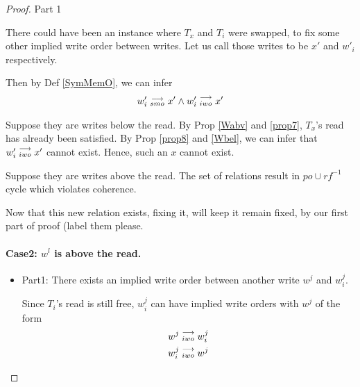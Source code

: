 \begin{proof}{Part 1}
\begin{itemize}
                        There could have been an instance where $T_x$ and $T_i$ were swapped, to fix some other implied write order between writes. 
                        Let us call those writes to be $x'$ and $w'_i$ respectively.
                        
                        Then by Def \ref{SymMemO}, we can infer 
                        \begin{align*}
                            w'_i\stackrel{\longrightarrow}{_{smo}}x' \wedge w'_i\stackrel{\longrightarrow}{_{iwo}}x'
                        \end{align*}

                        Suppose they are writes below the read. 
                        By Prop \ref{Wabv} and \ref{prop7}, $T_x$'s read has already been satisfied. By Prop \ref{prop8} and \ref{Wbel}, we can infer that $w'_i\stackrel{\longrightarrow}{_{iwo}}x'$ cannot exist. Hence, such an $x$ cannot exist.
                        
                        Suppose they are writes above the read.
                        The set of relations result in $po \cup rf^{-1}$ cycle which violates coherence.  


                \end{itemize}
                    Now that this new relation exists, fixing it, will keep it remain fixed, by our first part of proof (label them please. 
                    
            
            \paragraph{Case2: $w^l$ is above the read.}
                
                \begin{itemize}
                    \item Part1: There exists an implied write order between another write $w^j$ and $w_i^j$.

                        Since $T_i$'s read is still free, $w_i^j$ can have implied write orders with $w^j$ of the form
                        \begin{align*}
                            w^j\stackrel{\longrightarrow}{_{iwo}}w_i^j \\
                            w_i^j\stackrel{\longrightarrow}{_{iwo}}w^j 
                        \end{align*}


\end{itemize}
\end{proof}
